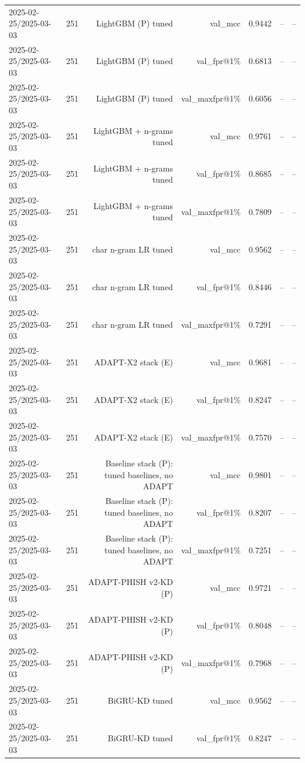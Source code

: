 \begin{table}[t]
\begin{tabular}{llrrrrr}
2025-02-25/2025-03-03 & 251 & LightGBM (P) tuned & val\_mcc & 0.9442 & -- & -- \\
2025-02-25/2025-03-03 & 251 & LightGBM (P) tuned & val\_fpr@1\% & 0.6813 & -- & -- \\
2025-02-25/2025-03-03 & 251 & LightGBM (P) tuned & val\_maxfpr@1\% & 0.6056 & -- & -- \\
2025-02-25/2025-03-03 & 251 & LightGBM + n-grams tuned & val\_mcc & 0.9761 & -- & -- \\
2025-02-25/2025-03-03 & 251 & LightGBM + n-grams tuned & val\_fpr@1\% & 0.8685 & -- & -- \\
2025-02-25/2025-03-03 & 251 & LightGBM + n-grams tuned & val\_maxfpr@1\% & 0.7809 & -- & -- \\
2025-02-25/2025-03-03 & 251 & char n-gram LR tuned & val\_mcc & 0.9562 & -- & -- \\
2025-02-25/2025-03-03 & 251 & char n-gram LR tuned & val\_fpr@1\% & 0.8446 & -- & -- \\
2025-02-25/2025-03-03 & 251 & char n-gram LR tuned & val\_maxfpr@1\% & 0.7291 & -- & -- \\
2025-02-25/2025-03-03 & 251 & ADAPT-X2 stack (E) & val\_mcc & 0.9681 & -- & -- \\
2025-02-25/2025-03-03 & 251 & ADAPT-X2 stack (E) & val\_fpr@1\% & 0.8247 & -- & -- \\
2025-02-25/2025-03-03 & 251 & ADAPT-X2 stack (E) & val\_maxfpr@1\% & 0.7570 & -- & -- \\
2025-02-25/2025-03-03 & 251 & Baseline stack (P): tuned baselines, no ADAPT & val\_mcc & 0.9801 & -- & -- \\
2025-02-25/2025-03-03 & 251 & Baseline stack (P): tuned baselines, no ADAPT & val\_fpr@1\% & 0.8207 & -- & -- \\
2025-02-25/2025-03-03 & 251 & Baseline stack (P): tuned baselines, no ADAPT & val\_maxfpr@1\% & 0.7251 & -- & -- \\
2025-02-25/2025-03-03 & 251 & ADAPT-PHISH v2-KD (P) & val\_mcc & 0.9721 & -- & -- \\
2025-02-25/2025-03-03 & 251 & ADAPT-PHISH v2-KD (P) & val\_fpr@1\% & 0.8048 & -- & -- \\
2025-02-25/2025-03-03 & 251 & ADAPT-PHISH v2-KD (P) & val\_maxfpr@1\% & 0.7968 & -- & -- \\
2025-02-25/2025-03-03 & 251 & BiGRU-KD tuned & val\_mcc & 0.9562 & -- & -- \\
2025-02-25/2025-03-03 & 251 & BiGRU-KD tuned & val\_fpr@1\% & 0.8247 & -- & -- \\

\end{tabular}
\end{table}
